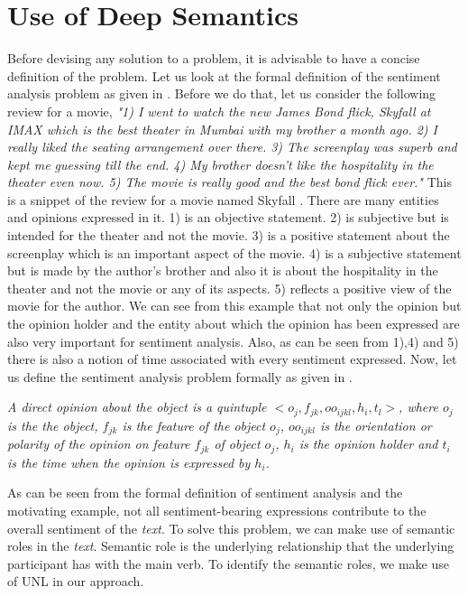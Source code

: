 \section{Use of Deep Semantics}\label{deep}
Before devising any solution to a problem, it is advisable to have a concise definition of the problem. Let us look at the formal definition of the sentiment analysis 
problem as given in \citep*{liu2010sentiment}. Before we do that, let us consider the following review for a movie, \textit{"1) I went to watch the new James Bond flick, 
Skyfall at IMAX which is the best theater in Mumbai with my brother a month ago. 2) I really liked the seating arrangement over there. 3) The screenplay was superb 
and kept me guessing till the end. 4) My brother doesn’t like the hospitality in the theater even now. 5) The movie is really good and the best bond flick ever."}
This is a snippet of the review for a movie named Skyfall . There are many entities and opinions expressed in it. 1) is an objective statement. 2) is subjective but 
is intended for the theater and not the movie. 3) is a positive statement about the screenplay which is an important aspect of the movie. 4) is a subjective
statement but is made by the author’s brother and also it is about the hospitality in the theater and not the movie or any of its aspects. 5) reflects a positive
view of the movie for the author. We can see from this example that not only the opinion but the opinion holder and the entity about which the opinion has been expressed 
are also very important for sentiment analysis. Also, as can be seen from 1),4) and 5) there is also a notion of time associated with every sentiment expressed.
Now, let us define the sentiment analysis problem formally as given in \citep*{liu2010sentiment}.
  
\textit{A direct opinion about the object is a quintuple \(<o_j,f_{jk},oo_{ijkl},h_i,t_l>\), where \(o_j\) is the the object, \(f_{jk}\) is the feature of the object
\(o_j\), \(oo_{ijkl}\) is the orientation or polarity of the opinion on feature \(f_{jk}\) of object \(o_j\), \(h_i\) is the opinion holder and \(t_i\) is the time 
when the opinion is expressed by \(h_i\).}
  
As can be seen from the formal definition of sentiment analysis and the motivating example, not all sentiment-bearing expressions contribute to the overall sentiment
of the \textit{text}. To solve this problem, we can make use of semantic roles in the \textit{text}. Semantic role is the underlying relationship that the underlying
participant has with the main verb. To identify the semantic roles, we make use of UNL in our approach.
  
